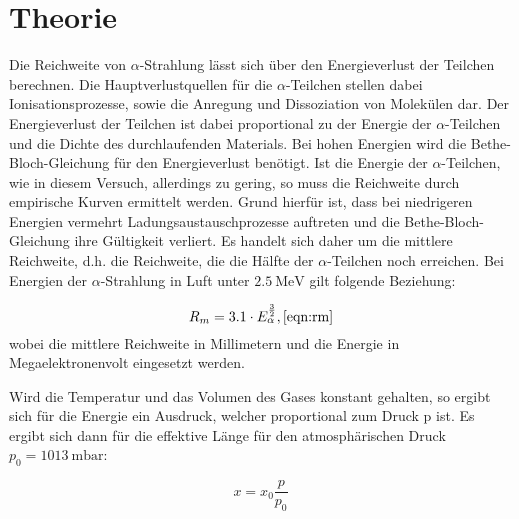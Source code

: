 \section{Theorie}
\label{sec:Theorie}

Die Reichweite von $\alpha$-Strahlung lässt sich über den Energieverlust der Teilchen berechnen.
Die Hauptverlustquellen für die $\alpha$-Teilchen stellen dabei Ionisationsprozesse, sowie die Anregung und Dissoziation von Molekülen dar.
Der Energieverlust der Teilchen ist dabei proportional zu der Energie der $\alpha$-Teilchen und die Dichte des durchlaufenden Materials.
Bei hohen Energien wird die Bethe-Bloch-Gleichung für den Energieverlust benötigt.
Ist die Energie der $\alpha$-Teilchen, wie in diesem Versuch, allerdings zu gering, so muss die Reichweite durch empirische Kurven ermittelt werden.
Grund hierfür ist, dass bei niedrigeren Energien vermehrt Ladungsaustauschprozesse auftreten und die Bethe-Bloch-Gleichung ihre Gültigkeit verliert.
Es handelt sich daher um die mittlere Reichweite, d.h. die Reichweite, die die Hälfte der $\alpha$-Teilchen noch erreichen.
Bei Energien der $\alpha$-Strahlung in Luft unter $\SI{2.5}{\mega\electronvolt}$ gilt folgende Beziehung:

\begin{equation}
  R_m = 3.1 \cdot E_{\alpha}^{\frac{3}{2}},
  \ref{eqn:rm}
\end{equation}
wobei die mittlere Reichweite in Millimetern und die Energie in Megaelektronenvolt eingesetzt werden.

Wird die Temperatur und das Volumen des Gases konstant gehalten, so ergibt sich für die Energie ein Ausdruck, welcher proportional zum Druck p ist.
Es ergibt sich dann für die effektive Länge für den atmosphärischen Druck $p_0 = \SI{1013}{\milli\bar}$:

\begin{equation}
  x = x_0 \frac{p}{p_0}
  \label{eqn:xeff}
\end{equation}
